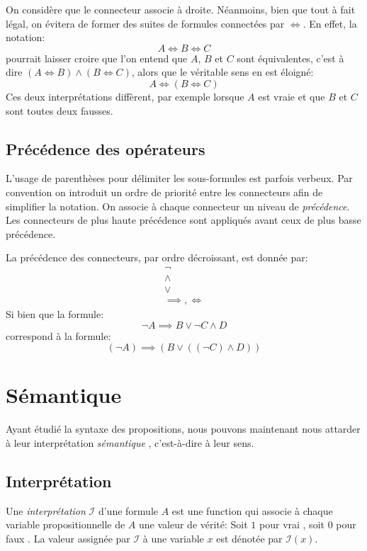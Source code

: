 On considère que le connecteur associe à droite.
Néanmoins, bien que tout à fait légal, on évitera de former des suites de formules connectées par ${\iff}$.
En effet, la notation:
\[
A \iff B \iff C
\]
pourrait laisser croire que l'on entend que $A$, $B$ et $C$ sont équivalentes, c'est à dire $(A \iff B) \wedge (B \iff C)$,
alors que le véritable sens en est éloigné:
\[
A \iff (B \iff C)
\] 
Ces deux interprétations diffèrent, par exemple lorsque $A$ est vraie et que $B$ et $C$ sont toutes deux fausses.

\subsection{Précédence des opérateurs}

L'usage de parenthèses pour délimiter les sous-formules est parfois verbeux.
Par convention on introduit un ordre de priorité entre les connecteurs afin de simplifier la notation.
On associe à chaque connecteur un niveau de \textit{précédence}. Les connecteurs de plus haute précédence sont appliqués avant ceux de plus basse précédence.

La précédence des connecteurs, par ordre décroissant, est donnée par:
\begin{gather*}
{\neg}\\
{\wedge}\\
{\vee}\\
{\implies}, {\iff}
\end{gather*}
Si bien que la formule:
\[
\neg A \implies B \vee \neg C \wedge D
\]
correspond à la formule:
\[
(\neg A) \implies (B \vee ((\neg C) \wedge D))
\]

\section{Sémantique}

Ayant étudié la syntaxe des propositions, nous pouvons maintenant nous attarder à leur interprétation \og \textit{sémantique} \fg{}, c'est-à-dire à leur sens.

\subsection{Interprétation}

Une \textit{interprétation} $\mathcal{I}$ d'une formule $A$ est une function qui associe à chaque variable propositionnelle de $A$ une valeur de vérité: Soit $1$ pour \og vrai \fg, soit $0$ pour \og faux \fg.
La valeur assignée par $\mathcal{I}$ à une variable $x$ est dénotée par $\mathcal{I}(x)$.

